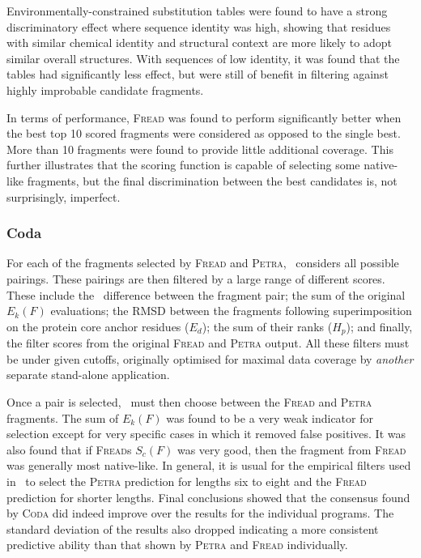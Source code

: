 Environmentally-constrained substitution tables were found to have a strong
discriminatory effect where sequence identity was high, showing that residues
with similar chemical identity and structural context are more likely to adopt similar overall structures.
With sequences of low identity, it was found that the tables had significantly
less effect, but were still of benefit in filtering against highly improbable
candidate fragments.


In terms of performance, \textsc{Fread} was found to perform significantly better  when the best top 10 scored fragments were considered as opposed to the single best. More than 10 fragments were found to provide little additional coverage. This further illustrates that the scoring function is capable of selecting some native-like fragments, but the final discrimination between the best candidates is, not surprisingly, imperfect.

\subsubsection{Coda}
\label{section:methcomp:coda}
For each of the fragments selected by \textsc{Fread} and \textsc{Petra},
\coda\ considers all possible pairings. These pairings are then filtered by a large range of different scores. These include the \phipsi\ difference between the fragment pair; the sum of the  original $E_k(F)$
evaluations; the RMSD between the fragments following superimposition on the protein core anchor residues ($E_d$); the sum of their ranks ($H_p$); and finally, the filter scores from the original
\textsc{Fread} and \textsc{Petra} output. All these filters must be under given cutoffs, originally optimised for maximal data coverage by \emph{another} separate stand-alone application.

Once a pair is selected, \coda\ must then choose between the \textsc{Fread} and \textsc{Petra} fragments. The sum of $E_k(F)$ was found to be a very
weak indicator for selection except for very specific cases in
which it removed false positives.
 It was also found that if \textsc{Fread}s $S_c(F)$
was very good, then the fragment from \textsc{Fread} was generally most native-like. In general, it is usual
for the empirical filters used in \coda\
to select the \textsc{Petra} prediction for
lengths six to eight and the \textsc{Fread} prediction for shorter lengths.
Final conclusions showed that the consensus found by \textsc{Coda} did indeed improve over the
results for the individual programs. The standard
deviation of the results also dropped indicating a more
consistent predictive ability than that shown by \textsc{Petra} and
\textsc{Fread} individually.
  

